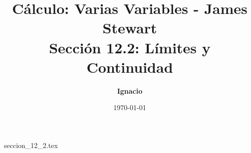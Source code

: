 \documentclass[11pt,spanish,oneside]{report}
\title{\textbf{Cálculo: Varias Variables - James Stewart} \\ \Large Sección 12.2: Límites y Continuidad}
\author{\textbf{Ignacio}}
\date{\today}
\begin{document}
\maketitle

{seccion_12_2.tex}
\end{document}
